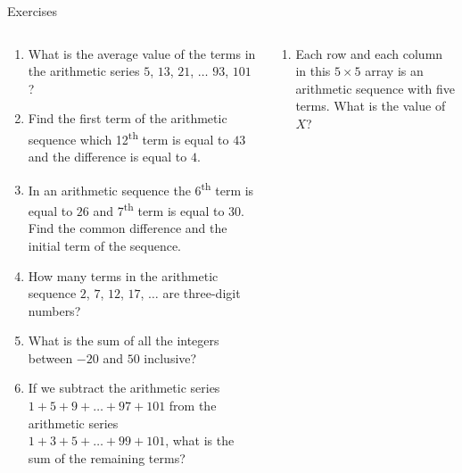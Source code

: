 \documentclass[9pt,aspectratio=169]{beamer}
\begin{document}
\begin{frame}{Exercises}
  \begin{columns}[T]
    \begin{column}{0.5\textwidth}
      \begin{enumerate}
        \item What is the average value of the terms in the arithmetic series $5$, $13$, $21$, $\ldots$ $93$, $101$?
        \item Find the first term of the arithmetic sequence which 12\textsuperscript{th} term is equal to $43$ and the difference is equal to $4$.
        \item In an arithmetic sequence the 6\textsuperscript{th} term is equal to $26$ and 7\textsuperscript{th} term is equal to $30$. Find the common difference and the initial term of the sequence.
        \item How many terms in the arithmetic sequence $2$, $7$, $12$, $17$, $\ldots$ are three-digit numbers?
        \item What is the sum of all the integers between $−20$ and $50$ inclusive?
        \item If we subtract the arithmetic series $1 + 5 + 9 + \ldots + 97 + 101$ from the arithmetic series $1 + 3 + 5 + \ldots + 99 + 101$, what is the sum of the remaining terms?
        \seti
      \end{enumerate}
    \end{column}
    \begin{column}{0.5\textwidth}
      \begin{enumerate}
        \conti
        \item Each row and each column in this $5 \times 5$ array is an arithmetic sequence with five terms. What is the value of $X$?
        

\end{enumerate}
\end{column}
\end{columns}
\end{frame}
\end{document}
